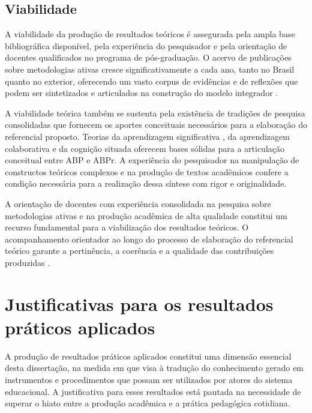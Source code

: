 \subsection{Viabilidade}
\label{subsec:jt_viabilidade}

A viabilidade da produção de resultados teóricos é assegurada pela ampla base bibliográfica disponível, pela experiência do pesquisador e pela orientação de docentes qualificados no programa de pós-graduação. O acervo de publicações sobre metodologias ativas cresce significativamente a cada ano, tanto no Brasil quanto no exterior, oferecendo um vasto corpus de evidências e de reflexões que podem ser sintetizados e articulados na construção do modelo integrador \cite{SANTOS2024}.

A viabilidade teórica também se sustenta pela existência de tradições de pesquisa consolidadas que fornecem os aportes conceituais necessários para a elaboração do referencial proposto. Teorias da aprendizagem significativa \cite{AUSUBEL2000}, da aprendizagem colaborativa e da cognição situada oferecem bases sólidas para a articulação conceitual entre ABP e ABPr. A experiência do pesquisador na manipulação de constructos teóricos complexos e na produção de textos acadêmicos confere a condição necessária para a realização dessa síntese com rigor e originalidade.

A orientação de docentes com experiência consolidada na pesquisa sobre metodologias ativas e na produção acadêmica de alta qualidade constitui um recurso fundamental para a viabilização dos resultados teóricos. O acompanhamento orientador ao longo do processo de elaboração do referencial teórico garante a pertinência, a coerência e a qualidade das contribuições produzidas \cite{LIBANEO2006}.

\section{Justificativas para os resultados práticos aplicados}
\label{sec:justificativa_praticos}

A produção de resultados práticos aplicados constitui uma dimensão essencial desta dissertação, na medida em que visa à tradução do conhecimento gerado em instrumentos e procedimentos que possam ser utilizados por atores do sistema educacional. A justificativa para esses resultados está pautada na necessidade de superar o hiato entre a produção acadêmica e a prática pedagógica cotidiana.

